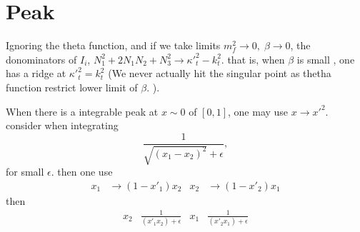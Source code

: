 \documentclass[12pt]{article}
\begin{document}
\section{Peak}
Ignoring the theta function, and if we take limits $m_f^2\rightarrow0,\;\beta\rightarrow0$, 
the donominators of $I_i$, $N_1^2+2N_1N_2+N_3^2\rightarrow {\kappa'}_t^2-k_t^2$.
that is, when $\beta$ is small , one has a ridge at ${\kappa'}_t^2=k_t^2$ (We never actually hit the singular point as thetha function restrict lower limit of $\beta$. ).

When there is a integrable peak at $x\sim0$ of $[0,1]$, one may use $x\rightarrow {x'}^2$. 
consider when integrating 
\begin{equation}
\frac{1}{\sqrt{(x_1-x_2)^2}+\epsilon},
\end{equation}
for small $\epsilon$.
 then one use
\begin{align}
x_1 &\rightarrow (1-{x'}_1) x_2& x_2 &\rightarrow (1-{x'}_2) x_1
\end{align}
then
\begin{align}
x_2&\frac{1}{ ({x'}_1 x_2)+\epsilon}& x_1&\frac{1}{({x'}_2 x_1)+\epsilon}
\end{align}


\end{document}
